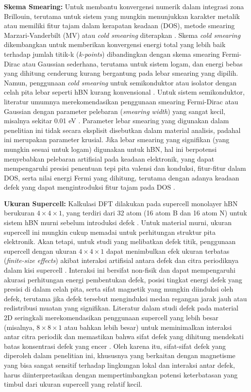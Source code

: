 \textbf{Skema Smearing:}
Untuk membantu konvergensi numerik dalam integrasi zona Brillouin, terutama untuk sistem yang mungkin menunjukkan karakter metalik atau memiliki fitur tajam dalam kerapatan keadaan (DOS), metode smearing Marzari-Vanderbilt (MV) atau \textit{cold smearing} \cite{Marzari1999} diterapkan \cite{[1, 1]}. Skema \textit{cold smearing} dikembangkan untuk memberikan konvergensi energi total yang lebih baik terhadap jumlah titik-k (\textit{k-points}) dibandingkan dengan skema smearing Fermi-Dirac atau Gaussian sederhana, terutama untuk sistem logam, dan energi bebas yang dihitung cenderung kurang bergantung pada lebar smearing yang dipilih. Namun, penggunaan \textit{cold smearing} untuk semikonduktor atau isolator dengan celah pita lebar seperti hBN kurang konvensional \cite{[1]}. Untuk sistem semikonduktor, literatur umumnya merekomendasikan penggunaan smearing Fermi-Dirac atau Gaussian dengan parameter pelebaran (\textit{smearing width}) yang sangat kecil, misalnya sekitar 0.01 eV \cite{[1]}. Parameter lebar smearing yang digunakan dalam penelitian ini tidak secara eksplisit disebutkan dalam material analisis, padahal ini merupakan parameter krusial. Jika lebar smearing yang signifikan (yang mungkin sesuai untuk logam) digunakan untuk hBN, hal ini berpotensi menyebabkan pelebaran artifisial pada keadaan elektronik, yang dapat mempengaruhi presisi penentuan tepi pita valensi dan konduksi, fitur-fitur dalam DOS, serta nilai energi Fermi yang dihitung, terutama dengan adanya keadaan defek yang dapat mengintroduksi fitur tajam pada DOS \cite{[1]}.

\textbf{Ukuran Supercell:}
Kalkulasi DFT dilakukan pada supercell monolayer hBN berukuran $4 \times 4 \times 1$, yang terdiri dari 32 atom (16 atom B dan 16 atom N) untuk sistem hBN murni sebelum introduksi defek \cite{[1, 1]}. Untuk material murni, ukuran supercell ini mungkin cukup memadai untuk perhitungan struktur pita elektronik. Akan tetapi, untuk studi yang melibatkan defek titik, penggunaan supercell dengan ukuran $4 \times 4 \times 1$ dapat menimbulkan efek ukuran terbatas (\textit{finite-size effects}) akibat interaksi artifisial antara defek dan citra periodiknya dalam kisi supercell \cite{[1]}. Interaksi ini bersifat non-fisik dan dapat mempengaruhi akurasi perhitungan energi pembentukan defek, posisi tingkat energi defek yang presisi di dalam celah pita, serta sifat magnetik yang mungkin diinduksi oleh defek, terutama jika defek tersebut menginduksi medan regangan jarak jauh atau redistribusi muatan yang signifikan. Literatur dalam studi defek pada material 2D seringkali merekomendasikan penggunaan supercell yang lebih besar (misalnya, $8 \times 8 \times 1$ atau bahkan lebih besar) untuk meminimalkan interaksi antar citra periodik dan memastikan bahwa sifat defek yang dihitung mendekati batas konsentrasi defek yang encer \cite{[1], Freysoldt2014}. Oleh karena itu, sifat-sifat defek yang diperoleh dalam penelitian ini, khususnya yang berkaitan dengan magnetisme yang bisa sangat sensitif terhadap lingkungan lokal dan interaksi antar defek, harus diinterpretasikan dengan mempertimbangkan potensi keterbatasan yang timbul dari ukuran supercell yang relatif kecil.

